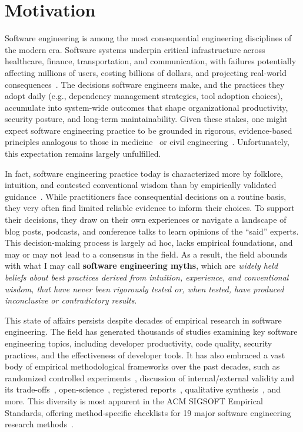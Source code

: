 \section{Motivation}

Software engineering is among the most consequential engineering disciplines of the modern era. 
Software systems underpin critical infrastructure across healthcare, finance, transportation, and communication, with failures potentially affecting millions of users, costing billions of dollars, and projecting real-world consequences~\cite{eghbal2016roads, solar-wind, xz-attack}. 
The decisions software engineers make, and the practices they adopt daily (e.g., dependency management strategies, tool adoption choices), accumulate into system-wide outcomes that shape organizational productivity, security posture, and long-term maintainability. 
Given these stakes, one might expect software engineering practice to be grounded in rigorous, evidence-based principles analogous to those in medicine~\cite{sackett1996evidence} or civil engineering~\cite{petroski1985engineer}. 
Unfortunately, this expectation remains largely unfulfilled.

In fact, software engineering practice today is characterized more by folklore, intuition, and contested conventional wisdom than by empirically validated guidance~\cite{DBLP:conf/icse/Devanbu0B16, DBLP:journals/ese/GarousiBO20, DBLP:journals/ese/ShrikanthNFM21, enoiu2026folklore}. 
While practitioners face consequential decisions on a routine basis, they very often find limited reliable evidence to inform their choices. 
To support their decisions, they draw on their own experiences or navigate a landscape of blog posts, podcasts, and conference talks to learn opinions of the ``said'' experts. 
This decision-making process is largely ad hoc, lacks empirical foundations, and may or may not lead to a consensus in the field.
As a result, the field abounds with what I may call \textbf{software engineering myths}, which are \emph{widely held beliefs about best practices derived from intuition, experience, and conventional wisdom, that have never been rigorously tested or, when tested, have produced inconclusive or contradictory results}.

This state of affairs persists despite decades of empirical research in software engineering. 
The field has generated thousands of studies examining key software engineering topics, including developer productivity, code quality, security practices, and the effectiveness of developer tools. 
It has also embraced a vast body of empirical methodological frameworks over the past decades, such as randomized controlled experiments~\cite{DBLP:books/sp/WohlinRHORW24}, discussion of internal/external validity and its trade-offs~\cite{DBLP:conf/icse/SiegmundSA15, DBLP:journals/tosem/RobillardAEGLNNSSS24}, open-science~\cite{DBLP:books/sp/20/0001G0S20}, registered reports~\cite{DBLP:journals/ese/ErnstB23}, qualitative synthesis~\cite{DBLP:conf/esem/CruzesD11}, and more.
This diversity is most apparent in the ACM SIGSOFT Empirical Standards, offering method-specific checklists for 19 major software engineering research methods~\cite{DBLP:journals/corr/abs-2010-03525}.

